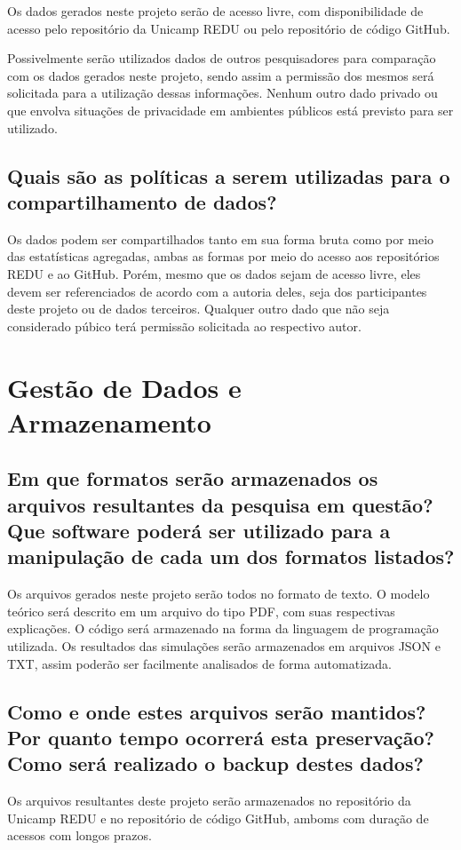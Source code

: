 \documentclass[11pt]{article}
\begin{document}
Os dados gerados neste projeto serão de acesso livre, com disponibilidade de acesso pelo repositório da Unicamp REDU ou pelo repositório de código GitHub.

Possivelmente serão utilizados dados de outros pesquisadores para comparação com os dados gerados neste projeto, sendo assim a permissão dos mesmos será solicitada para a utilização dessas informações. Nenhum outro dado privado ou que envolva situações de privacidade em ambientes públicos está previsto para ser utilizado.

\subsection*{Quais são as políticas a serem utilizadas para o compartilhamento de dados?}

Os dados podem ser compartilhados tanto em sua forma bruta como por meio das estatísticas agregadas, ambas as formas por meio do acesso aos repositórios REDU e ao GitHub. Porém, mesmo que os dados sejam de acesso livre, eles devem ser referenciados de acordo com a autoria deles, seja dos participantes deste projeto ou de dados terceiros. Qualquer outro dado que não seja considerado púbico terá permissão solicitada ao respectivo autor.

\section*{Gestão de Dados e Armazenamento}

\subsection*{Em que formatos serão armazenados os arquivos resultantes da pesquisa em questão? Que software poderá ser utilizado para a manipulação de cada um dos formatos listados?}

Os arquivos gerados neste projeto serão todos no formato de texto. O modelo teórico será descrito em um arquivo do tipo PDF, com suas respectivas explicações. O código será armazenado na forma da linguagem de programação utilizada. Os resultados das simulações serão armazenados em arquivos JSON e TXT, assim poderão ser facilmente analisados de forma automatizada.

\subsection*{Como e onde estes arquivos serão mantidos? Por quanto tempo ocorrerá esta preservação? Como será realizado o backup destes dados?}

Os arquivos resultantes deste projeto serão armazenados no repositório da Unicamp REDU e no repositório de código GitHub, amboms com duração de acessos com longos prazos.
\end{document}

